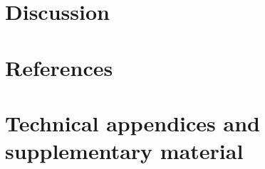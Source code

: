 \documentclass{article}
\begin{document}
\section{Discussion}

\section*{References}


\appendix

\section{Technical appendices and supplementary material}


\newpage



\end{document}
